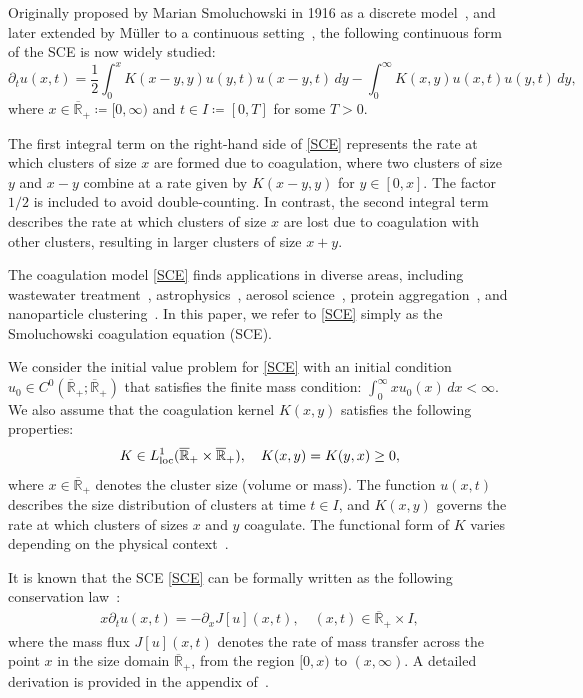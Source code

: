 \documentclass[a4paper,11pt]{article}
\def\Rb{\overline{{\mathbb R}}_+}
\begin{document}
Originally proposed by Marian Smoluchowski in 1916 as a discrete model~\cite{Smoluchowski1916}, and later extended by M\"{u}ller to a continuous setting~\cite{Muller1928}, the following continuous form of the SCE is now widely studied:
\begin{equation}\label{SCE}
  \partial_t u(x,t)=\frac{1}{2} \int_{0}^{x}K(x-y,y)u(y,t)u(x-y,t)\,dy
  - \int_{0}^{\infty}K(x,y)u(x,t)u(y,t)\,dy,
\end{equation}
where $x \in \Rb \coloneqq [0, \infty)$ and $t \in I \coloneqq [0, T]$ for some $T > 0$.

The first integral term on the right-hand side of \eqref{SCE} represents the rate at which clusters of size $x$ are formed due to coagulation, where two clusters of size $y$ and $x - y$ combine at a rate given by $K(x - y, y)$ for $y \in [0, x]$. The factor $1/2$ is included to avoid double-counting. In contrast, the second integral term describes the rate at which clusters of size $x$ are lost due to coagulation with other clusters, resulting in larger clusters of size $x + y$.

The coagulation model \eqref{SCE} finds applications in diverse areas, including wastewater treatment~\cite{Z-O-R-V2015}, astrophysics~\cite{Estrada-Cuzzi2008,Kolesnichenko2020}, aerosol science~\cite{Ferreira2021}, protein aggregation~\cite{Z-K-R2018}, and nanoparticle clustering~\cite{Alexandrov2021}. In this paper, we refer to \eqref{SCE} simply as the Smoluchowski coagulation equation (SCE).

We consider the initial value problem for \eqref{SCE} with an initial condition $u_0 \in C^0(\Rb; \Rb)$ that satisfies the finite mass condition: $\int_{0}^{\infty} x u_0(x)\,dx < \infty$. We also assume that the coagulation kernel $K(x, y)$ satisfies the following properties:
\begin{align}\label{Kcond}
K \in L^1_{\rm loc} (\Rb \times \Rb), \quad K(x, y) = K(y, x) \ge 0,
\end{align}
where $x \in \Rb$ denotes the cluster size (volume or mass). The function $u(x,t)$ describes the size distribution of clusters at time $t \in I$, and $K(x, y)$ governs the rate at which clusters of sizes $x$ and $y$ coagulate. The functional form of $K$ varies depending on the physical context~\cite{Aldous1999, S-H-P1994}.

It is known that the SCE \eqref{SCE} can be formally written as the following conservation law~\cite{Filbet-Laurencot2004, M-F-F-K1998, T-I-N1996}:
\begin{align}\label{conservation law}
  x \partial_t u(x,t) = -\partial_x J[u](x,t), \quad (x,t) \in \Rb \times I,
\end{align}
where the mass flux $J[u](x,t)$ denotes the rate of mass transfer across the point $x$ in the size domain $\Rb$, from the region $[0, x)$ to $(x, \infty)$. A detailed derivation is provided in the appendix of~\cite{I-K-M2023}.
\end{document}
